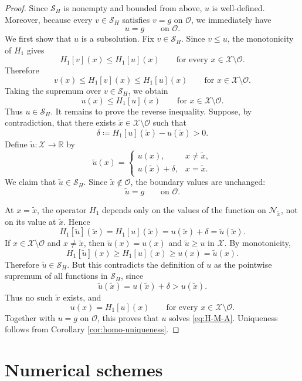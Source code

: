 \documentclass[reqno,11pt]{amsart}
\numberwithin{equation}{section}
\theoremstyle{definition}
\theoremstyle{remark}
\begin{document}
\begin{proof}
Since \(\mathcal S_H\) is nonempty and bounded from above, \(u\) is well-defined. Moreover, because every \(v\in\mathcal S_H\) satisfies \(v=g\) on \(\mathcal O\), we immediately have
\[
    u=g
    \qquad\text{on }\mathcal O.
\]
We first show that \(u\) is a subsolution. Fix \(v\in\mathcal S_H\). Since \(v\le u\), the monotonicity of \(H_1\) gives
\[
    H_1[v](x)\le H_1[u](x)
    \qquad\text{for every }x\in\mathcal X\setminus\mathcal O.
\]
Therefore
\[
    v(x)\le H_1[v](x)\le H_1[u](x)
    \qquad\text{for }x\in\mathcal X\setminus\mathcal O.
\]
Taking the supremum over \(v\in\mathcal S_H\), we obtain
\[
    u(x)\le H_1[u](x)
    \qquad\text{for }x\in\mathcal X\setminus\mathcal O.
\]
Thus \(u\in\mathcal S_H\). It remains to prove the reverse inequality. Suppose, by contradiction, that there exists \(\tilde x\in\mathcal X\setminus\mathcal O\) such that
\[
    \delta
    \coloneqq
    H_1[u](\tilde x)-u(\tilde x)
    >0.
\]
Define \(\tilde u\colon\mathcal X\to\mathbb R\) by
\[
    \tilde u(x)
    =
    \begin{cases}
        u(x), & x\ne \tilde x,\\
        u(\tilde x)+\delta, & x=\tilde x.
    \end{cases}
\]
We claim that \(\tilde u\in\mathcal S_H\). Since \(\tilde x\notin\mathcal O\), the boundary values are unchanged:
\[
    \tilde u=g
    \qquad\text{on }\mathcal O.
\]

At \(x=\tilde x\), the operator \(H_1\) depends only on the values of the function on \(\mathcal N_{\tilde x}\), not on its value at \(\tilde x\). Hence
\[
    H_1[\tilde u](\tilde x)
    =
    H_1[u](\tilde x)
    =
    u(\tilde x)+\delta
    =
    \tilde u(\tilde x).
\]
If \(x\in\mathcal X\setminus\mathcal O\) and \(x\ne\tilde x\), then \(\tilde u(x)=u(x)\) and \(\tilde u\ge u\) in \(\mathcal X\). By monotonicity,
\[
    H_1[\tilde u](x)\ge H_1[u](x)\ge u(x)=\tilde u(x).
\]
Therefore \(\tilde u\in\mathcal S_H\). But this contradicts the definition of \(u\) as the pointwise supremum of all functions in \(\mathcal S_H\), since
\[
    \tilde u(\tilde x)
    =
    u(\tilde x)+\delta
    >
    u(\tilde x).
\]
Thus no such \(\tilde x\) exists, and
\[
    u(x)=H_1[u](x)
    \qquad\text{for every }x\in\mathcal X\setminus\mathcal O.
\]
Together with \(u=g\) on \(\mathcal O\), this proves that \(u\) solves \eqref{eq:H-M-A}. Uniqueness follows from Corollary \ref{cor:homo-uniqueness}.
\end{proof}

\section{Numerical schemes}\label{sct:numerical-schemes}
\end{document}
